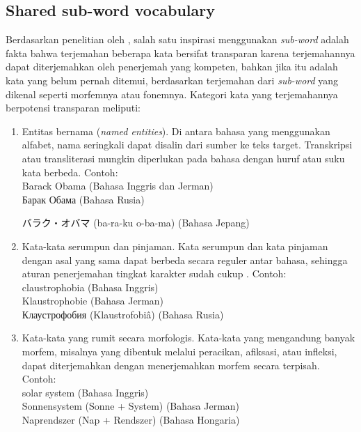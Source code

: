     \subsection{Shared sub-word vocabulary}
    Berdasarkan penelitian oleh \parencite{Sennrich_Haddow_Birch_2016}, salah satu inspirasi menggunakan \textit{sub-word} adalah fakta bahwa terjemahan beberapa kata bersifat transparan karena terjemahannya dapat diterjemahkan oleh penerjemah yang kompeten, bahkan jika itu adalah kata yang belum pernah ditemui, berdasarkan terjemahan dari \textit{sub-word} yang dikenal seperti morfemnya atau fonemnya. Kategori kata yang terjemahannya berpotensi transparan meliputi:

    \begin{enumerate}
        \item Entitas bernama (\textit{named entities}). Di antara bahasa yang menggunakan alfabet, nama seringkali dapat disalin dari sumber ke teks target. Transkripsi atau transliterasi mungkin diperlukan pada bahasa dengan huruf atau suku kata berbeda. Contoh: \\
        Barack Obama (Bahasa Inggris dan Jerman) \\
        \foreignlanguage{russian}{Барак Обама} (Bahasa Rusia) \\
        \begin{CJK}{UTF8}{min}
        バラク・オバマ (ba-ra-ku o-ba-ma) (Bahasa Jepang)
        \end{CJK}

        \item Kata-kata serumpun dan pinjaman. Kata serumpun dan kata pinjaman dengan asal yang sama dapat berbeda secara reguler antar bahasa, sehingga aturan penerjemahan tingkat karakter sudah cukup \parencite{Tiedemann2012}. Contoh:  \\
        claustrophobia (Bahasa Inggris) \\
        Klaustrophobie (Bahasa Jerman) \\
        \foreignlanguage{russian}{Клаустрофобия} (Klaustrofobiâ) (Bahasa Rusia)

        \item Kata-kata yang rumit secara morfologis. Kata-kata yang mengandung banyak morfem, misalnya yang dibentuk melalui peracikan, afiksasi, atau infleksi, dapat diterjemahkan dengan menerjemahkan morfem secara terpisah. Contoh:  \\
        solar system (Bahasa Inggris) \\
        Sonnensystem (Sonne + System) (Bahasa Jerman) \\
        Naprendszer (Nap + Rendszer) (Bahasa Hongaria)
    \end{enumerate}

